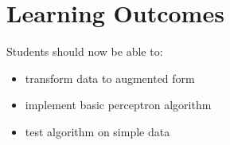\documentclass[12pt]{book}
\begin{document}
\section*{Learning Outcomes}
Students should now be able to:
\begin{itemize}
        \item transform data to augmented form
        \item implement basic perceptron algorithm
        \item test algorithm on simple data
\end{itemize}
\end{document}
